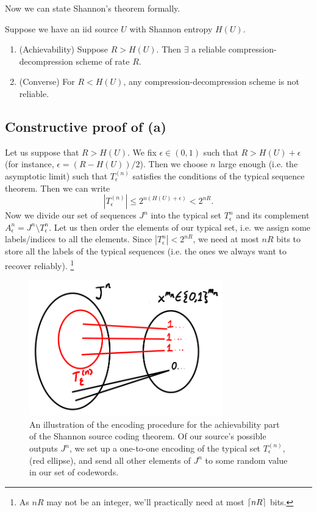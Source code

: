 Now we can state Shannon's theorem formally.
\begin{thm}
Suppose we have an iid source $U$ with Shannon entropy $H(U)$.
\begin{enumerate}
    \item (Achievability) Suppose $R>H(U)$. Then $\exists$ a reliable compression-decompression scheme of rate $R.$
    \item (Converse) For $R< H(U)$, any compression-decompression scheme is not reliable.
\end{enumerate}
\end{thm}

\subsection*{Constructive proof of (a)} Let us suppose that $R>H(U)$. We fix $\epsilon \in (0,1)$ such that $R>H(U)+\epsilon$ (for instance, $\epsilon = (R-H(U))/2$). Then we choose $n$ large enough (i.e. the asymptotic limit) such that $T_\epsilon^{(n)}$ satisfies the conditions of the typical sequence theorem. Then we can write
\begin{equation}
    |T_\epsilon^{(n)}| \leq 2^{n(H(U)+\epsilon)}< 2^{nR}.
\end{equation}
Now we divide our set of sequences $J^n$ into the typical set $T_\epsilon^{n}$ and its complement $A_\epsilon^{n}=J^n \setminus T_\epsilon^{n}.$ Let us then order the elements of our typical set, i.e. we assign some labels/indices to all the elements. Since $|T_\epsilon^n| < 2^{nR}$, we need at most $nR$ bits to store all the labels of the typical sequences (i.e. the ones we always want to recover reliably).%
    \footnote{As $nR$ may not be an integer, we'll practically need at most $\lceil nR\rceil$ bits.}

\begin{figure}
    \centering
    \includegraphics[width=0.75\textwidth]{2019/01/20190121_shannonsourcecoding.png}
    \caption{An illustration of the encoding procedure for the achievability part of the Shannon source coding theorem. Of our source's possible outputs $J^n$, we set up a one-to-one encoding of the typical set $T_\epsilon^{(n)}$, (red ellipse), and send all other elements of $J^n$ to some random value in our set of codewords.}
    \label{fig:shannonsourcecoding}
\end{figure}

